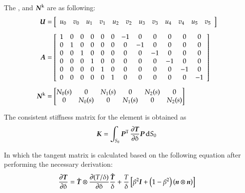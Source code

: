 The ,  and $\boldsymbol{N}^\mathrm{k}$ are as following:
\begin{align}
  \boldsymbol{U} &= \left [
    \begin{array}{c c c c c c c c c c c c}
      u_0 & v_0 & u_1 & v_1 & u_2 & v_2 & u_3 & v_3 & u_4 & v_4 & u_5 & v_5
    \end{array}\right ]\\[1ex]
  \boldsymbol{A} &= \left [\begin{array}{c c c c c c c c c c c c}
      1 & 0 & 0 & 0& 0 & 0 & -1& 0 & 0 &0 &0 &0\\
      0 &1& 0&0 &0 &0 &0 & -1& 0& 0 & 0 &0\\
      0 &0& 1&0 &0 &0 &0 & 0& -1& 0 & 0 &0\\
      0 &0& 0&1 &0 &0 &0 & 0& 0& -1 & 0 &0\\
      0 &0& 0&0 &1 &0 &0 & 0& 0& 0 & -1 &0\\
      0 &0& 0&0 &0 &1 &0 & 0& 0& 0 & 0 &-1
    \end{array} \right ]\\[1ex]
  \boldsymbol{N}^\mathrm{k} &= \begin{bmatrix}
    N_0(s) & 0 & N_1(s) &0 & N_2(s) & 0\\
    0 & N_0(s)& 0 &N_1(s)& 0 & N_2(s)
  \end{bmatrix}
\end{align}

The consistent stiffness matrix for the element is obtained as
\begin{equation}
  \label{eq:cohesive_stiffness}
  \boldsymbol{K}    =    \int_{S_0}    \boldsymbol{P}^\mathrm{T}\,
    \frac{\partial{\ensuremath{\boldsymbol{T}}}} {\partial{\delta}} \boldsymbol{P} \,\mathrm{d}
    S_0
\end{equation}

In which the tangent matrix is calculated based on the following
equation after performing the necessary derivation:
\begin{equation}
  \label{eq:tangent_cohesive}
  \frac{\partial{\ensuremath{\boldsymbol{T}}}} {\partial{\delta}} = \hat{\boldsymbol{T}} \otimes
  \frac                       {\partial{(T/\delta)}}{\partial{\delta}}
  \frac{\hat{\boldsymbol{T}}}{\delta}+ \frac{T}{\delta}  \left[ \beta^2 \boldsymbol{I} +
  \left(1-\beta^2\right) \left(\boldsymbol{n} \otimes \boldsymbol{n}\right)\right]
\end{equation}



